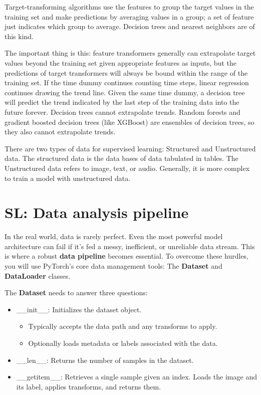 \documentclass[12pt]{report}
\begin{document}
Target-transforming algorithms use the features to group the target values in the training set and make predictions by averaging values in a group; a set of feature just indicates which group to average. Decision trees and nearest neighbors are of this kind.

The important thing is this: feature transformers generally can extrapolate target values beyond the training set given appropriate features as inputs, but the predictions of target transformers will always be bound within the range of the training set. If the time dummy continues counting time steps, linear regression continues drawing the trend line. Given the same time dummy, a decision tree will predict the trend indicated by the last step of the training data into the future forever. Decision trees cannot extrapolate trends. Random forests and gradient boosted decision trees (like XGBoost) are ensembles of decision trees, so they also cannot extrapolate trends.

There are two types of data for supervised learning: Structured and Unstructured data. The structured data is the data bases of data tabulated in tables. The Unstructured data refers to image, text, or audio. Generally, it is more complex to train a model with unstructured data.

\section{SL: Data analysis pipeline}

In the real world, data is rarely perfect. Even the most powerful model architecture can fail if it's fed a messy, inefficient, or unreliable data stream. This is where a robust \textbf{data pipeline} becomes essential. To overcome these hurdles, you will use PyTorch's core data management tools: The \textbf{Dataset} and \textbf{DataLoader} classes.

The \textbf{Dataset} needs to answer three questions:
\begin{itemize}
\item \_\_init\_\_: Initializes the dataset object.
\begin{itemize}
  \item Typically accepts the data path and any transforms to apply.
  \item Optionally loads metadata or labels associated with the data.
\end{itemize}
\item \_\_len\_\_: Returns the number of samples in the dataset.
\item \_\_getitem\_\_: Retrieves a single sample given an index. Loads the image and its label, applies transforms, and returns them.
\end{itemize}
\end{document}
